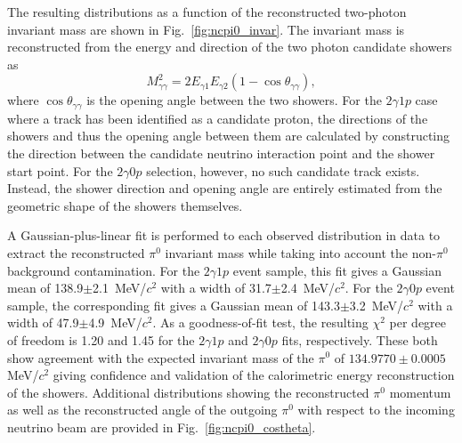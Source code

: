 The resulting distributions as a function of the reconstructed two-photon invariant mass are shown in Fig.~\ref{fig:ncpi0_invar}. The invariant mass is reconstructed from the energy and direction of the two photon candidate showers as
\begin{equation}
   M_{\gamma \gamma}^2 = 2 E_{\gamma 1} E_{\gamma 2} (1- \cos \theta_{\gamma\gamma}),  
   \label{eq:invariant_mass}
\end{equation}
where $\cos \theta_{\gamma\gamma}$ is the opening angle between the two showers. For the $2\gamma1p$ case where a track has been identified as a candidate proton, the directions of the showers and thus the opening angle between them are calculated by constructing the direction between the candidate neutrino interaction point and the shower start point. For the $2\gamma0p$ selection, however, no such candidate track exists. Instead, the shower direction and opening angle are entirely estimated from the geometric shape of the showers themselves. 

A Gaussian-plus-linear fit is performed to each observed distribution in data to extract the reconstructed $\pi^0$ invariant mass while taking into account the non-$\pi^0$ background contamination. For the $2\gamma 1p$ event sample, this fit gives a Gaussian mean of 138.9$\pm$2.1~MeV/$c^2$ with a width of 31.7$\pm$2.4~MeV/$c^2$. For the $2\gamma 0p$ event sample, the corresponding fit gives a Gaussian mean of 143.3$\pm$3.2~MeV/$c^2$ with a width of 47.9$\pm$4.9~MeV/$c^2$. As a goodness-of-fit test, the resulting $\chi^2$ per degree of freedom is 1.20 and 1.45 for the $2\gamma 1p$ and $2\gamma 0p$ fits, respectively. These both show agreement with the expected invariant mass of the $\pi^0$ of $134.9770\pm0.0005$ MeV/$c^2$ \cite{ParticleDataGroup:2020ssz} giving confidence and validation of the calorimetric energy reconstruction of the showers. Additional distributions showing the reconstructed $\pi^0$ momentum as well as the reconstructed angle of the outgoing $\pi^0$ with respect to the incoming neutrino beam are provided in Fig.~\ref{fig:ncpi0_costheta}. 

